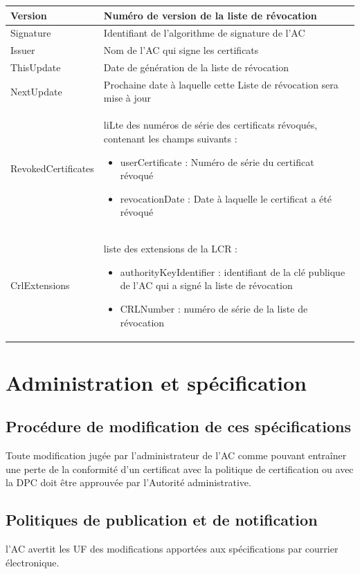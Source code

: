 \documentclass[a4paper,11pt,french]{article}
\begin{document}
\begin{tabular}{|l|p{10cm}|}
\hline
Version  & Numéro de version de la liste de révocation
\\
\hline
Signature  & Identifiant de l'algorithme de signature de l'AC

\\
\hline
Issuer  & Nom de l'AC qui signe les certificats
 
\\
\hline
ThisUpdate  & Date de génération de la liste de révocation
\\
\hline
NextUpdate  & Prochaine date à laquelle cette Liste de révocation sera mise à jour 

\\
\hline
RevokedCertificates  & liLte des numéros de série des certificats révoqués, contenant les champs suivants :
\begin{itemize}
\item userCertificate : Numéro de série du certificat révoqué 
\item revocationDate : Date à laquelle le certificat a été révoqué

\end{itemize}

\\
\hline
CrlExtensions &  liste des extensions de la LCR :
\begin{itemize}
\item authorityKeyIdentifier : identifiant de la clé publique de l’AC qui a signé la liste de révocation
\item CRLNumber : numéro de série de la liste de révocation 
\end{itemize}
\\
\hline

\end{tabular}

\section{Administration et spécification}
\subsection{Procédure de modification de ces spécifications}
Toute modification jugée par l’administrateur de l’AC comme pouvant entraîner une perte de la conformité d’un certificat avec la politique de certification ou avec la DPC doit être
approuvée par l’Autorité administrative. 

\subsection{Politiques de publication et de notification}
l'AC avertit les UF des modifications apportées aux spécifications par courrier électronique.
\end{document}
